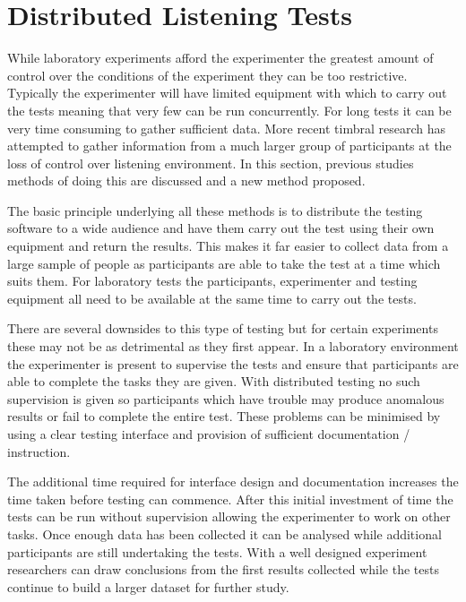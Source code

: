 \section{Distributed Listening Tests}
\label{sec:ListeningTests-DistributedListeningTests}
	While laboratory experiments afford the experimenter the greatest amount of control over the conditions of the
	experiment they can be too restrictive. Typically the experimenter will have limited equipment with which to carry
	out the tests meaning that very few can be run concurrently. For long tests it can be very time consuming to gather
	sufficient data. More recent timbral research has attempted to gather information from a much larger group of
	participants at the loss of control over listening environment. In this section, previous studies methods of doing
	this are discussed and a new method proposed.

	The basic principle underlying all these methods is to distribute the testing software to a wide audience and have
	them carry out the test using their own equipment and return the results. This makes it far easier to collect data
	from a large sample of people as participants are able to take the test at a time which suits them. For laboratory
	tests the participants, experimenter and testing equipment all need to be available at the same time to carry out
	the tests.

	There are several downsides to this type of testing but for certain experiments these may not be as detrimental as
	they first appear. In a laboratory environment the experimenter is present to supervise the tests and ensure that
	participants are able to complete the tasks they are given. With distributed testing no such supervision is given so
	participants which have trouble may produce anomalous results or fail to complete the entire test. These problems
	can be minimised by using a clear testing interface and provision of sufficient documentation / instruction.

	The additional time required for interface design and documentation increases the time taken before testing can
	commence. After this initial investment of time the tests can be run without supervision allowing the experimenter
	to work on other tasks. Once enough data has been collected it can be analysed while additional participants are
	still undertaking the tests. With a well designed experiment researchers can draw conclusions from the first results
	collected while the tests continue to build a larger dataset for further study.

